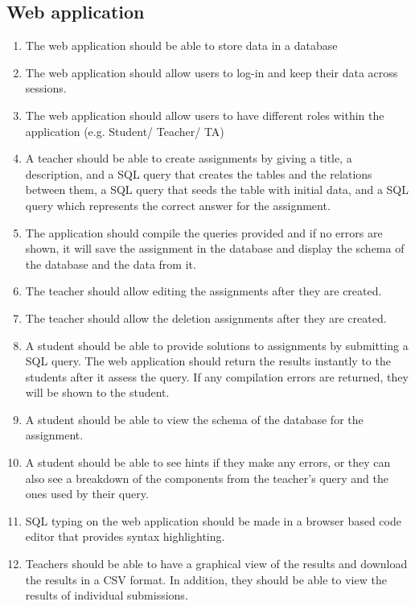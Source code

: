 \subsection{Web application}
\begin{enumerate}[label=R-\arabic*]
  \item The web application should be able to store data in a database
  \item The web application should allow users to log-in and keep their data
    across sessions.
  \item The web application should allow users to have different roles within the
    application (e.g. Student/ Teacher/ TA)
  \item  A teacher should be able to create assignments by giving a title, a description, and a SQL query that creates the tables and the relations between them, a SQL query that seeds the table with initial data, and a SQL query which represents the correct answer for the assignment.
  \item The application should compile the queries provided and if no errors are shown, it will save the assignment in the database and display the schema of the database and the data from it.
  \item The teacher should allow editing the assignments after they are created.
  \item The teacher should allow the deletion assignments after they are created.
  \item A student should be able to provide solutions to assignments by submitting a SQL query. The web application should return the results instantly to the students after it assess the query. If any compilation errors are returned, they will be shown to the student.
  \item A student should be able to view the schema of the database for the assignment.
  \item A student should be able to see hints if they make any errors, or they can also see a breakdown of the components from the teacher's query and the ones used by their query.
  \item SQL typing on the web application should be made in a browser based code editor that provides syntax highlighting.
  \item Teachers should be able to have a graphical view of the results and download the results in a CSV format. In addition, they should be able to view the results of individual submissions.
\end{enumerate}

